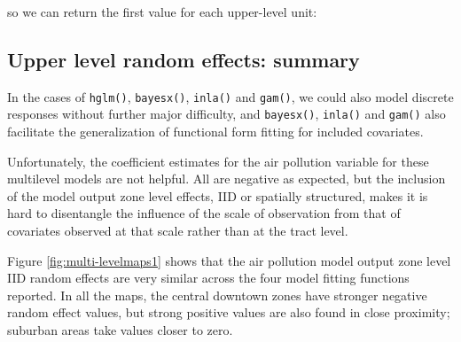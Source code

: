 \documentclass[]{book}
\newenvironment{Shaded}{\begin{snugshade}}{\end{snugshade}}
\newcommand{\DataTypeTok}[1]{\textcolor[rgb]{0.13,0.29,0.53}{#1}}
\newcommand{\DecValTok}[1]{\textcolor[rgb]{0.00,0.00,0.81}{#1}}
\newcommand{\KeywordTok}[1]{\textcolor[rgb]{0.13,0.29,0.53}{\textbf{#1}}}
\newcommand{\NormalTok}[1]{#1}
\newcommand{\OperatorTok}[1]{\textcolor[rgb]{0.81,0.36,0.00}{\textbf{#1}}}
\newcommand{\StringTok}[1]{\textcolor[rgb]{0.31,0.60,0.02}{#1}}
\begin{document}
so we can return the first value for each upper-level unit:

\begin{Shaded}
\end{Shaded}

\hypertarget{upper-level-random-effects-summary}{%
\subsection{Upper level random effects: summary}\label{upper-level-random-effects-summary}}

In the cases of \texttt{hglm()}, \texttt{bayesx()}, \texttt{inla()} and \texttt{gam()}, we could also model discrete responses without further major difficulty, and \texttt{bayesx()}, \texttt{inla()} and \texttt{gam()} also facilitate the generalization of functional form fitting for included covariates.

Unfortunately, the coefficient estimates for the air pollution variable for these multilevel models are not helpful. All are negative as expected, but the inclusion of the model output zone level effects, IID or spatially structured, makes it is hard to disentangle the influence of the scale of observation from that of covariates observed at that scale rather than at the tract level.

Figure \ref{fig:multi-levelmaps1} shows that the air pollution model output zone level IID random effects are very similar across the four model fitting functions reported. In all the maps, the central downtown zones have stronger negative random effect values, but strong positive values are also found in close proximity; suburban areas take values closer to zero.
\end{document}
